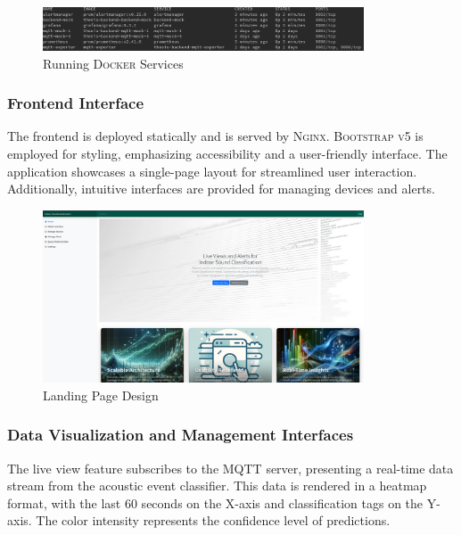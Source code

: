 \begin{figure}[htbp]
  \centering
  \includegraphics[width=0.85\textwidth]{Pictures/dockerps}
  \caption{\label{fig:dockerps}Running \textsc{Docker} Services}
\end{figure}

\subsubsection{Frontend Interface}
The frontend is deployed statically and is served by \textsc{Nginx}. \textsc{Bootstrap v5} is employed for styling, emphasizing accessibility and a user-friendly interface. The application showcases a single-page layout for streamlined user interaction. Additionally, intuitive interfaces are provided for managing devices and alerts.

\begin{figure}[htbp]
  \centering
  \includegraphics[width=0.85\textwidth]{Pictures/home}
  \caption{\label{fig:schome}Landing Page Design}
\end{figure}

\subsubsection{Data Visualization and Management Interfaces}
The live view feature subscribes to the MQTT server, presenting a real-time data stream from the acoustic event classifier. This data is rendered in a heatmap format, with the last 60 seconds on the X-axis and classification tags on the Y-axis. The color intensity represents the confidence level of predictions.



